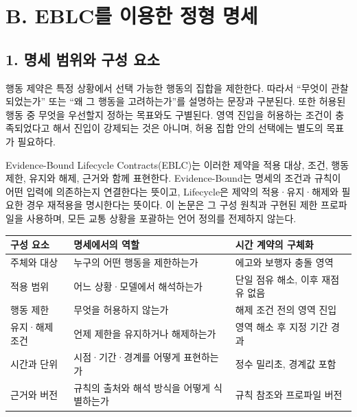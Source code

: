 \documentclass[11pt,a4paper]{article}
\begin{document}
\section*{B. EBLC를 이용한 정형 명세}

\subsection*{1. 명세 범위와 구성 요소}

행동 제약은 특정 상황에서 선택 가능한 행동의 집합을 제한한다. 따라서 “무엇이 관찰되었는가” 또는 “왜 그 행동을 고려하는가”를 설명하는 문장과 구분된다. 또한 허용된 행동 중 무엇을 우선할지 정하는 목표와도 구별된다. 영역 진입을 허용하는 조건이 충족되었다고 해서 진입이 강제되는 것은 아니며, 허용 집합 안의 선택에는 별도의 목표가 필요하다.\par

Evidence-Bound Lifecycle Contracts(EBLC)는 이러한 제약을 적용 대상, 조건, 행동 제한, 유지와 해제, 근거와 함께 표현한다. Evidence-Bound는 명세의 조건과 규칙이 어떤 입력에 의존하는지 연결한다는 뜻이고, Lifecycle은 제약의 적용·유지·해제와 필요한 경우 재적용을 명시한다는 뜻이다. 이 논문은 그 구성 원칙과 구현된 제한 프로파일을 사용하며, 모든 교통 상황을 포괄하는 언어 정의를 전제하지 않는다.\par

\par\medskip\noindent\begin{minipage}{\linewidth}\small
\begin{tabular}{@{}>{\raggedright\arraybackslash}p{}>{\raggedright\arraybackslash}p{}>{\raggedright\arraybackslash}p{}@{}}
\toprule
\textbf{구성 요소} & \textbf{명세에서의 역할} & \textbf{시간 계약의 구체화} \\
\midrule
주체와 대상 & 누구의 어떤 행동을 제한하는가 & 에고와 보행자 충돌 영역 \\
적용 범위 & 어느 상황·모델에서 해석하는가 & 단일 점유 해소, 이후 재점유 없음 \\
행동 제한 & 무엇을 허용하지 않는가 & 해제 조건 전의 영역 진입 \\
유지·해제 조건 & 언제 제한을 유지하거나 해제하는가 & 영역 해소 후 지정 기간 경과 \\
시간과 단위 & 시점·기간·경계를 어떻게 표현하는가 & 정수 밀리초, 경계값 포함 \\
근거와 버전 & 규칙의 출처와 해석 방식을 어떻게 식별하는가 & 규칙 참조와 프로파일 버전 \\
\bottomrule\end{tabular}\end{minipage}\par\medskip
\end{document}
